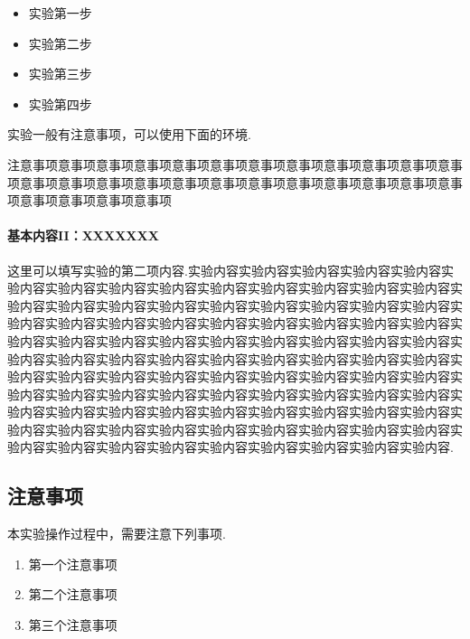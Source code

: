 \documentclass[9pt,a4paper,twoside]{../rho-class/rho}
\begin{document}
\begin{itemize}
    \item 实验第一步
    \item 实验第二步
    \item 实验第三步
    \item 实验第四步
\end{itemize}
实验一般有注意事项，可以使用下面的环境.
\begin{rhoenv}[frametitle=注意.]
    注意事项意事项意事项意事项意事项意事项意事项意事项意事项意事项意事项意事项意事项意事项意事项意事项意事项意事项意事项意事项意事项意事项意事项意事项意事项意事项意事项意事项
\end{rhoenv}
\paragraph{基本内容II：XXXXXXX}
这里可以填写实验的第二项内容.实验内容实验内容实验内容实验内容实验内容实验内容实验内容实验内容实验内容实验内容实验内容实验内容实验内容实验内容实验内容实验内容实验内容实验内容实验内容实验内容实验内容实验内容实验内容实验内容实验内容实验内容实验内容实验内容实验内容实验内容实验内容实验内容实验内容实验内容实验内容实验内容实验内容实验内容实验内容实验内容实验内容实验内容实验内容实验内容实验内容实验内容实验内容实验内容实验内容实验内容实验内容实验内容实验内容实验内容实验内容实验内容实验内容实验内容实验内容实验内容实验内容实验内容实验内容实验内容实验内容实验内容实验内容实验内容实验内容实验内容实验内容实验内容实验内容实验内容实验内容实验内容实验内容实验内容实验内容实验内容实验内容实验内容实验内容实验内容实验内容实验内容实验内容实验内容实验内容实验内容实验内容实验内容实验内容实验内容实验内容.
\subsection{注意事项}
本实验操作过程中，需要注意下列事项.
\begin{enumerate}
    \item 第一个注意事项
    \item 第二个注意事项
    \item 第三个注意事项
\end{enumerate}
\end{document}
